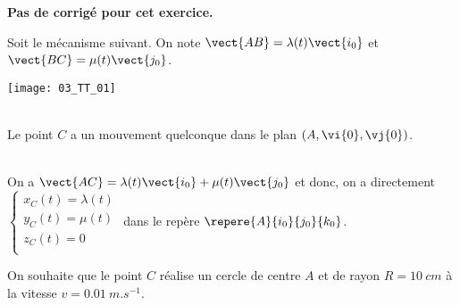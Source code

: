 \normaltrue
\correctiontrue



\setcounter{question}{0}
\ifcorrection
\else
\textbf{Pas de corrigé pour cet exercice.}
\fi

\ifprof
\else
Soit le mécanisme suivant. On note $\vect{AB}=\lambda(t)\vect{i_0}$ et $\vect{BC}=\mu(t)\vect{j_0}$.
\begin{center}
\texttt{[image: 03\_TT\_01]}
\end{center}
\fi


\ifprof
\else
{}
\fi

\ifprof ~\\
Le point $C$ a un mouvement quelconque dans le plan $\left(A,\vi{0},\vj{0}\right)$.
\else
\fi

\ifprof ~\\
On  a $\vect{AC}=\lambda(t)\vect{i_0}+\mu(t)\vect{j_0}$ et donc, on a directement 
$\left\{
\begin{array}{l}
x_C(t)= \lambda(t) \\
y_C(t)= \mu(t)\\
z_C(t)= 0\\
\end{array}
\right.
$ dans le repère $\repere{A}{i_0}{j_0}{k_0}$.

\else
\fi

On souhaite que le point $C$ réalise un cercle de centre $A$ et de rayon $R=\SI{10}{cm}$ à la vitesse $v=\SI{0,01}{m.s^{-1}}$. 

